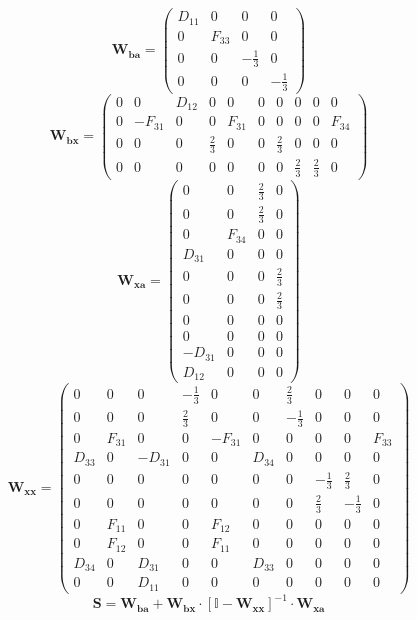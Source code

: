\[ \mathbf{W_{ba}} = \left(\begin{smallmatrix} D_{11} & 0 & 0 & 0 \\ 0
& F_{33} & 0 & 0 \\ 0 & 0 & -\frac{1}{3} & 0 \\ 0 & 0 & 0 &
-\frac{1}{3} \end{smallmatrix}\right) \]
\[ \mathbf{W_{bx}} = \left(\begin{smallmatrix} 0 & 0 & D_{12} & 0 & 0
& 0 & 0 & 0 & 0 & 0 \\ 0 & -F_{31} & 0 & 0 & F_{31} & 0 & 0 & 0 & 0 &
F_{34} \\ 0 & 0 & 0 & \frac{2}{3} & 0 & 0 & \frac{2}{3} & 0 & 0 & 0 \\
0 & 0 & 0 & 0 & 0 & 0 & 0 & \frac{2}{3} & \frac{2}{3} & 0
\end{smallmatrix}\right) \]
\[ \mathbf{W_{xa}} = \left(\begin{smallmatrix} 0 & 0 & \frac{2}{3} & 0
\\ 0 & 0 & \frac{2}{3} & 0 \\ 0 & F_{34} & 0 & 0 \\ D_{31} & 0 & 0 & 0
\\ 0 & 0 & 0 & \frac{2}{3} \\ 0 & 0 & 0 & \frac{2}{3} \\ 0 & 0 & 0 & 0
\\ 0 & 0 & 0 & 0 \\ -D_{31} & 0 & 0 & 0 \\ D_{12} & 0 & 0 & 0
\end{smallmatrix}\right) \]
\[ \mathbf{W_{xx}} = \left(\begin{smallmatrix} 0 & 0 & 0 &
-\frac{1}{3} & 0 & 0 & \frac{2}{3} & 0 & 0 & 0 \\ 0 & 0 & 0 &
\frac{2}{3} & 0 & 0 & -\frac{1}{3} & 0 & 0 & 0 \\ 0 & F_{31} & 0 & 0 &
-F_{31} & 0 & 0 & 0 & 0 & F_{33} \\ D_{33} & 0 & -D_{31} & 0 & 0 &
D_{34} & 0 & 0 & 0 & 0 \\ 0 & 0 & 0 & 0 & 0 & 0 & 0 & -\frac{1}{3} &
\frac{2}{3} & 0 \\ 0 & 0 & 0 & 0 & 0 & 0 & 0 & \frac{2}{3} &
-\frac{1}{3} & 0 \\ 0 & F_{11} & 0 & 0 & F_{12} & 0 & 0 & 0 & 0 & 0 \\
0 & F_{12} & 0 & 0 & F_{11} & 0 & 0 & 0 & 0 & 0 \\ D_{34} & 0 & D_{31}
& 0 & 0 & D_{33} & 0 & 0 & 0 & 0 \\ 0 & 0 & D_{11} & 0 & 0 & 0 & 0 & 0
& 0 & 0 \end{smallmatrix}\right) \]
\[ \mathbf{S}=\mathbf{W_{ba}}+\mathbf{W_{bx}}\cdot\left[ \mathbb{I}
-\mathbf{W_{xx}}\right]^{-1}\cdot\mathbf{W_{xa}} \]
